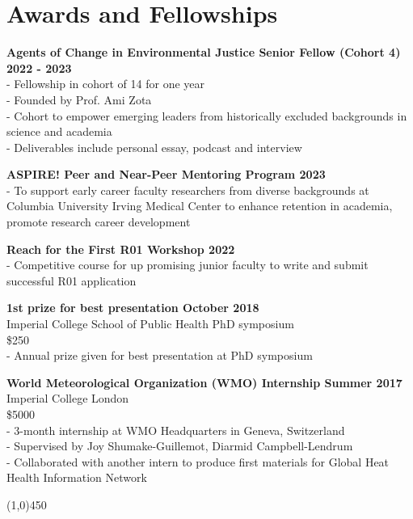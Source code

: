 \section*{Awards and Fellowships}

\noindent \textbf{Agents of Change in Environmental Justice Senior Fellow (Cohort 4) \hfill 2022 - 2023}\\
- Fellowship in cohort of 14 for one year\\
- Founded by Prof. Ami Zota\\
- Cohort to empower emerging leaders from historically excluded backgrounds in science and academia \\
- Deliverables include personal essay, podcast and interview \bigskip

\noindent \textbf{ASPIRE! Peer and Near-Peer Mentoring Program  \hfill 2023} \\
- To support early career faculty researchers from diverse backgrounds at Columbia University Irving Medical Center to enhance retention in academia, promote research career development \bigskip

\noindent \textbf{Reach for the First R01 Workshop \hfill 2022}\\ 
- Competitive course for up promising junior faculty to write and submit successful R01 application \bigskip

\noindent \textbf{1st prize for best presentation \hfill October 2018 }\\
Imperial College School of Public Health PhD symposium \\
\$250 \\
- Annual prize given for best presentation at PhD symposium \bigskip

\noindent \textbf{World Meteorological Organization (WMO) Internship \hfill Summer 2017 }\\ 
Imperial College London \\
\$5000 \\
- 3-month internship at WMO Headquarters in Geneva, Switzerland \\
- Supervised by Joy Shumake-Guillemot, Diarmid Campbell-Lendrum \\
- Collaborated with another intern to produce first materials for Global Heat Health Information Network

\begin{center} \line(1,0){450} \end{center}